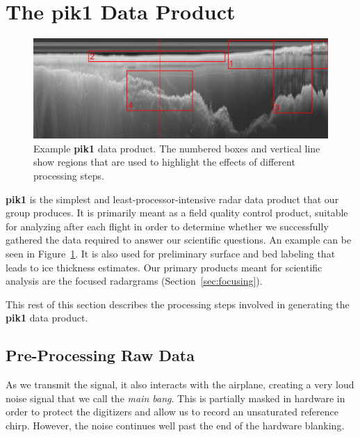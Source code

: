 \documentclass[11pt]{article}
\newcommand{\secref}[1]{Section~\ref{#1}}
\newcommand{\figref}[1]{Figure~\ref{#1}}
\begin{document}
\section{The \textbf{pik1} Data Product}
\label{sec:pik1}

\begin{figure}[ht!]
\centering
\includegraphics[width=1.0\columnwidth]{figures/TOT_pik1_labeled_small.jpg}
\caption[]{Example \textbf{pik1} data product. The numbered boxes and vertical line show regions that are used to highlight the effects of different processing steps.}
\label{fig:pik1}
\end{figure}


\textbf{pik1} is the simplest and least-processor-intensive radar data product that our group produces. It is primarily meant as a field quality control product, suitable for analyzing after each flight in order to determine whether we successfully gathered the data required to answer our scientific questions. An example can be seen in \figref{fig:pik1}. It is also used for preliminary surface and bed labeling that leads to ice thickness estimates. Our primary products meant for scientific analysis are the focused radargrams (\secref{sec:focusing}).

This rest of this section describes the processing steps involved in generating the \textbf{pik1} data product. 

\subsection{Pre-Processing Raw Data}
\label{sec:blanking}

As we transmit the signal, it also interacts with the airplane, creating a very loud noise signal that we call the \emph{main bang}. This is partially masked in hardware in order to protect the digitizers and allow us to record an unsaturated reference chirp. However, the noise continues well past the end of the hardware blanking. 
\end{document}
